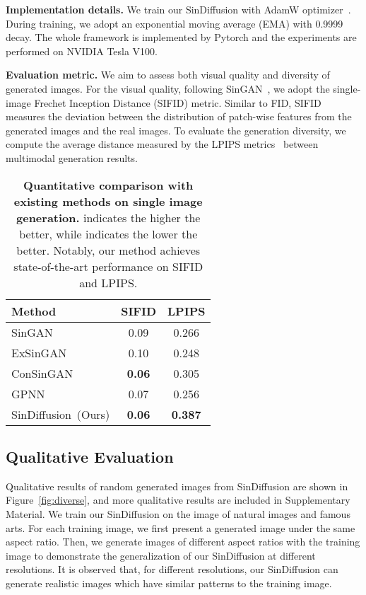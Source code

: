 \documentclass[10pt,twocolumn,letterpaper]{article}
\begin{document}
\noindent \textbf{Implementation details.}
We train our SinDiffusion with AdamW optimizer~\cite{IlyaLoshchilov2018DecoupledWD}.
During training, we adopt an exponential moving average (EMA) with 0.9999 decay.
The whole framework is implemented by Pytorch and the experiments are performed on NVIDIA Tesla V100.

\noindent \textbf{Evaluation metric.}
We aim to assess both visual quality and diversity of generated images.
For the visual quality, following SinGAN~\cite{shaham2019singan}, we adopt the single-image Frechet Inception Distance (SIFID) metric.
Similar to FID, SIFID measures the deviation between the distribution of patch-wise features from the generated images and the real images.
To evaluate the generation diversity, we compute the average distance measured by the LPIPS metrics~\cite{zhang2018unreasonable} between multimodal generation results.


\begin{table}[t]
    \footnotesize
    \centering
    \begin{tabular}{l @{\hskip 17mm} c @{\hskip 17mm} c}
    \toprule
    \textbf{Method} & \textbf{SIFID}  & \textbf{LPIPS}  \\
    \midrule
    {SinGAN~\cite{shaham2019singan}} & 0.09 & 0.266 \\
    {ExSinGAN~\cite{zhang2021exsingan}} & 0.10 & 0.248 \\
    {ConSinGAN~\cite{hinz2021improved}} & \textbf{0.06} & 0.305 \\
    {GPNN~\cite{granot2022drop}} & 0.07 & 0.256 \\
    {SinDiffusion~(Ours)} & \textbf{0.06} & \textbf{0.387} \\
    \bottomrule
    \end{tabular}
    \vspace{-3mm}
    \caption{\textbf{Quantitative comparison with existing methods on single image generation.}
     indicates the higher the better, while  indicates the lower the better.
    Notably, our method achieves state-of-the-art performance on SIFID and LPIPS. 
    }
    \vspace{-6mm}
    \label{tab:quantitative}
\end{table}

\subsection{Qualitative Evaluation}
Qualitative results of random generated images from SinDiffusion are shown in Figure~\ref{fig:diverse}, and more qualitative results are included in Supplementary Material.
We train our SinDiffusion on the image of natural images and famous arts.
For each training image, we first present a generated image under the same aspect ratio.
Then, we generate images of different aspect ratios with the training image to demonstrate the generalization of our SinDiffusion at different resolutions.
It is observed that, for different resolutions, our SinDiffusion can generate realistic images which have similar patterns to the training image. 
\end{document}
